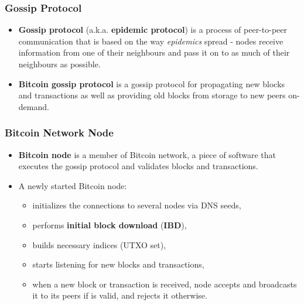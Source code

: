 \documentclass{beamer}
\begin{document}
\begin{frame}
  \frametitle{Gossip Protocol}
  \begin{itemize}
  \item \textbf{Gossip protocol} (a.k.a. \textbf{epidemic protocol}) is a
    process of peer-to-peer communication that is based on the way
    \textit{epidemics} spread - nodes receive information from one of their
    neighbours and pass it on to as much of their neighbours as possible.
  \item \textbf{Bitcoin gossip protocol} is a gossip protocol for propagating
    new blocks and transactions as well as providing old blocks from storage to
    new peers on-demand.
  \end{itemize}
  \begin{center}
  \end{center}
\end{frame}

\begin{frame}
  \frametitle{Bitcoin Network Node}
  \begin{itemize}
  \item \textbf{Bitcoin node} is a member of Bitcoin network, a piece of
    software that executes the gossip protocol and validates blocks and
    transactions.
  \item A newly started Bitcoin node:
    \begin{itemize}
    \item initializes the connections to several nodes via DNS seeds,
    \item performs \textbf{initial block download} (\textbf{IBD}),
    \item builds necessary indices (UTXO set),
    \item starts listening for new blocks and transactions,
    \item when a new block or transaction is received, node accepts and
      broadcasts it to its peers if is valid, and rejects it otherwise.
    \end{itemize}
  \end{itemize}
\end{frame}
\end{document}
